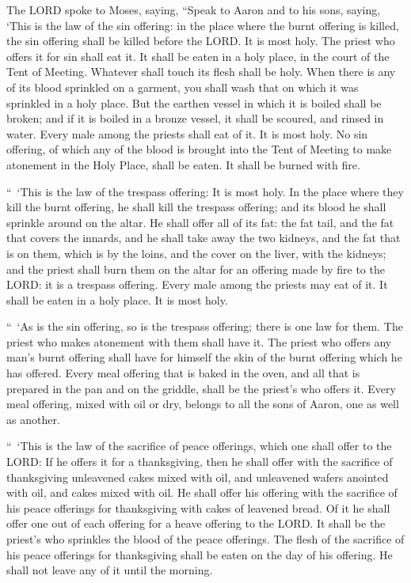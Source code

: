 \myverse{}The LORD spoke to Moses, saying,
\myverse{}“Speak to Aaron and to his sons, saying, ‘This is the law of the sin offering:
in the place where the burnt offering is killed, the sin offering shall be killed before the LORD. It
is most holy.
\myverse{}The priest who offers it for sin shall eat it. It shall be eaten in a holy
place, in the court of the Tent of Meeting.
\myverse{}Whatever shall touch its flesh shall be holy. When there is any of its blood
sprinkled on a garment, you shall wash that on which it was sprinkled in a holy place.
\myverse{}But the earthen vessel in which it is boiled shall be broken; and if it is
boiled in a bronze vessel, it shall be scoured, and rinsed in water.
\myverse{}Every male among the priests shall eat of it. It is most holy.
\myverse{}No sin offering, of which any of the blood is brought into the Tent of Meeting
to make atonement in the Holy Place, shall be eaten. It shall be burned with fire.


\mychapter{} \myverse*{}“ ‘This is the law of the trespass offering: It is most holy.
\myverse{}In the place where they kill the burnt offering, he shall kill the trespass
offering; and its blood he shall sprinkle around on the altar.
\myverse{}He shall offer all of its fat: the fat tail, and the fat that covers the innards,
\myverse{}and he shall take away the two kidneys, and the fat that is on them, which is
by the loins, and the cover on the liver, with the kidneys;
\myverse{}and the priest shall burn them on the altar for an offering made by fire to
the LORD: it is a trespass offering.
\myverse{}Every male among the priests may eat of it. It shall be eaten in a holy place.
It is most holy.


\myverse{}“ ‘As is the sin offering, so is the trespass offering; there is
one law for them. The priest who makes atonement with them shall have it.
\myverse{}The priest who offers any man’s burnt offering shall have for himself the skin
of the burnt offering which he has offered.
\myverse{}Every meal offering that is baked in the oven, and all that is prepared in the
pan and on the griddle, shall be the priest’s who offers it.
\myverse{}Every meal offering, mixed with oil or dry, belongs to all the sons of Aaron,
one as well as another.


\myverse{}“ ‘This is the law of the sacrifice of peace offerings, which
one shall offer to the LORD:
\myverse{}If he offers it for a thanksgiving, then he shall offer with the sacrifice
of thanksgiving unleavened cakes mixed with oil, and unleavened wafers anointed with oil, and cakes mixed
with oil.
\myverse{}He shall offer his offering with the sacrifice of his peace offerings for
thanksgiving with cakes of leavened bread.
\myverse{}Of it he shall offer one out of each offering for a heave offering to the
LORD. It shall be the priest’s who sprinkles the blood of the peace offerings.
\myverse{}The flesh of the sacrifice of his peace offerings for thanksgiving shall be
eaten on the day of his offering. He shall not leave any of it until the morning.


